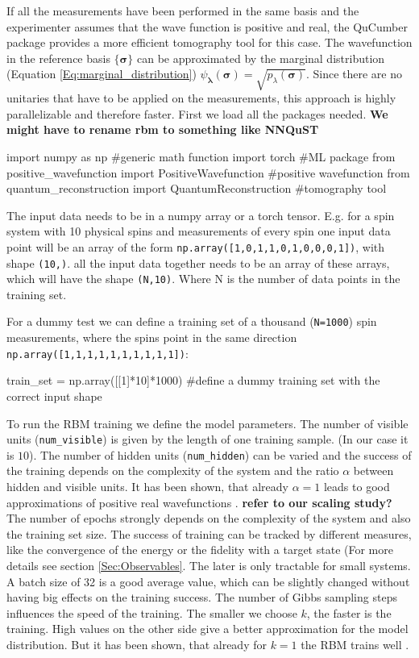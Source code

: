 \documentclass[submission, Phys]{SciPost}
\begin{document}
If all the measurements have been performed in the same basis and the experimenter assumes that the wave function is positive and real, the QuCumber package provides a more efficient tomography tool for this case. The wavefunction in the reference basis $\{ \bm{\sigma} \}$ can be approximated by the marginal distribution (Equation \ref{Eq:marginal_distribution}) $\psi_{\bm{\lambda}}(\bm{\sigma}) = \sqrt{p_{\lambda} ( \bm{\sigma})}$. Since there are no unitaries that have to be applied on the measurements, this approach is highly parallelizable  and therefore faster.
First we load all the packages needed. \textbf{We might have to rename rbm to something like NNQuST} 

\begin{python}
import numpy as np 		#generic math function
import torch 			#ML package
from positive_wavefunction import PositiveWavefunction #positive wavefunction
from quantum_reconstruction import QuantumReconstruction #tomography tool
\end{python} 

The input data needs to be in a numpy array or a torch tensor. E.g. for a spin system with 10 physical spins and measurements of every spin one input data point will be an array of the form \verb|np.array([1,0,1,1,0,1,0,0,0,1])|, with shape \verb|(10,)|. all the input data together needs to be an array of these arrays, which will have the shape \verb|(N,10)|. Where N is the number of data points in the training set.

For a dummy test we can define a training set of a thousand (\verb|N=1000|) spin measurements, where the spins point in the same direction \verb|np.array([1,1,1,1,1,1,1,1,1,1])|:

\begin{python}
train_set = np.array([[1]*10]*1000) #define a dummy training set with the correct input shape
\end{python}

To run the RBM training we define the model parameters. The number of visible units (\verb|num_visible|) is given by the length of one training sample. (In our case it is $10$). 
The number of hidden units (\verb|num_hidden|) can be varied and the success of the training depends on the complexity of the system and the ratio $\alpha$ between hidden and visible units. It has been shown, that already $\alpha = 1$ leads to good approximations of positive real wavefunctions \cite{Torlai2016thermo}.
\textbf{refer to our scaling study?} 
The number of epochs strongly depends on the complexity of the system and also the training set size. The success of training can be tracked by different measures, like the convergence of the energy or the fidelity with a target state (For more details see section \ref{Sec:Observables}. The later is only tractable for small systems. A batch size of 32 is a good average value, which can be slightly changed without having big effects on the training success. The number of Gibbs sampling steps influences the speed of the training. The smaller we choose $k$, the faster is the training. High values on the other side give a better approximation for the model distribution. But it has been shown, that already for $k=1$ the RBM trains well \cite{hinton2002training}.
\end{document}
